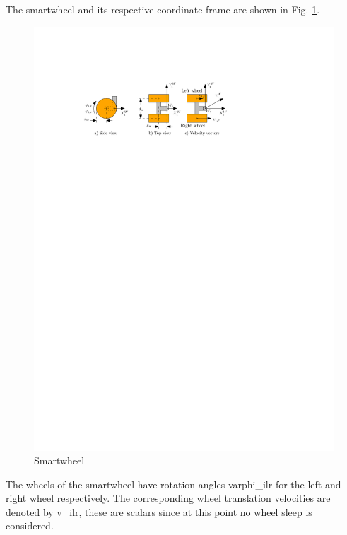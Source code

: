 \documentclass{article}
\begin{document}
    \glsaddall
	
	
	\printglossary[type=\acronymtype,title=Abbreviations,nonumberlist]
	
	\printglossary[title=Nomenclature,nonumberlist]
	\newpage
	
	
	The \gls{smartwheel} and its respective coordinate frame are shown in Fig. \ref{fig:Smartwheel}.
\begin{figure}[h]
	\centering
	\includegraphics[]{Smartwheel.pdf}
	\caption{Smartwheel}
	\label{fig:Smartwheel}
\end{figure}

The wheels of the \gls{smartwheel} have rotation angles \gls{varphi_ilr} for the left and right wheel respectively. The corresponding wheel translation velocities are denoted by \gls{v_ilr}, these are scalars since at this point no wheel sleep is considered.\\
\end{document}
